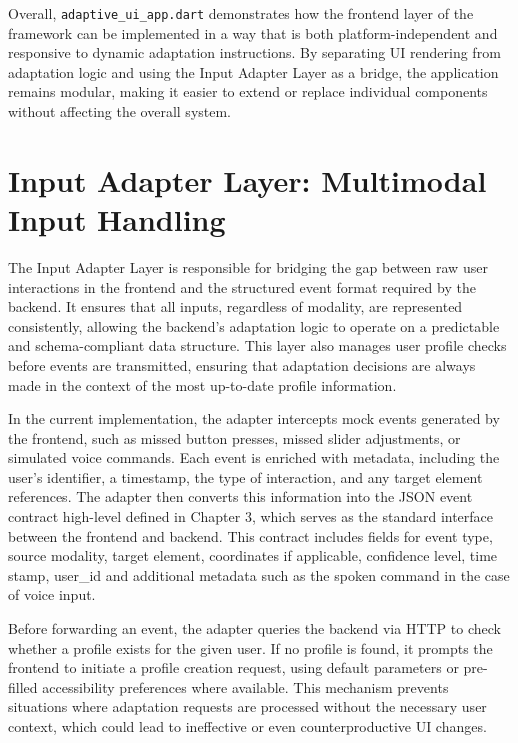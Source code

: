 \documentclass[openany]{book}
\begin{document}
Overall, \texttt{adaptive\_ui\_app.dart} demonstrates how the frontend layer of the framework can be implemented in a way that is both platform-independent and responsive to dynamic adaptation instructions. By separating UI rendering from adaptation logic and using the Input Adapter Layer as a bridge, the application remains modular, making it easier to extend or replace individual components without affecting the overall system.

\section{Input Adapter Layer: Multimodal Input Handling}
The Input Adapter Layer is responsible for bridging the gap between raw user interactions in the frontend and the structured event format required by the backend. It ensures that all inputs, regardless of modality, are represented consistently, allowing the backend’s adaptation logic to operate on a predictable and schema-compliant data structure. This layer also manages user profile checks before events are transmitted, ensuring that adaptation decisions are always made in the context of the most up-to-date profile information.

In the current implementation, the adapter intercepts mock events generated by the frontend, such as missed button presses, missed slider adjustments, or simulated voice commands. Each event is enriched with metadata, including the user’s identifier, a timestamp, the type of interaction, and any target element references. The adapter then converts this information into the JSON event contract high-level defined in Chapter 3, which serves as the standard interface between the frontend and backend. This contract includes fields for event type, source modality, target element, coordinates if applicable, confidence level, time stamp, user\_id and additional metadata such as the spoken command in the case of voice input.

Before forwarding an event, the adapter queries the backend via HTTP to check whether a profile exists for the given user. If no profile is found, it prompts the frontend to initiate a profile creation request, using default parameters or pre-filled accessibility preferences where available. This mechanism prevents situations where adaptation requests are processed without the necessary user context, which could lead to ineffective or even counterproductive UI changes.
\end{document}
